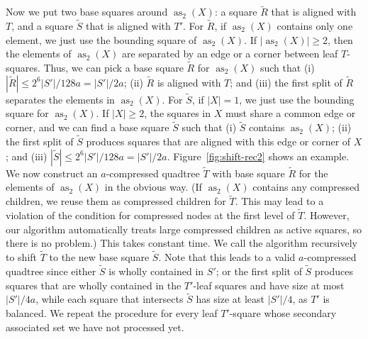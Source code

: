 \documentclass[11pt]{paper}
\DeclareMathOperator {\as}{as}
\begin{document}
      Now we put two base squares around $\as_2(X)$: a square $\widetilde{R}$
      that is aligned with $T$, and a square $\widetilde{S}$ that is 
      aligned with $T'$. For $\widetilde{R}$, if $\as_2(X)$ contains 
      only one element, we just use the bounding square of $\as_2(X)$.
      If $|\as_2(X)| \geq 2$, then the elements
      of $\as_2(X)$ are separated by an edge or a corner between 
      leaf $T$-squares. Thus,
      we can pick a base square $\widetilde{R}$ for $\as_2(X)$ such that 
      (i) $|\widetilde{R}| \leq 2^6|S'|/128a = |S'|/2a$; (ii) $\widetilde{R}$ is 
      aligned with $T$; and (iii) the first split of $\widetilde{R}$ 
      separates the elements in $\as_2(X)$.
      For $\widetilde{S}$, if $|X| =1$, we just use the bounding square for
      $\as_2(X)$. If $|X| \geq 2$, the squares in $X$ must share a common
      edge or corner, and we can find a base square $\widetilde{S}$ such that
      (i) $\widetilde{S}$ contains $\as_2(X)$; (ii) the first split of 
      $\widetilde{S}$ produces squares that are aligned with this edge or 
      corner of $X$; and (iii) $|\widetilde{S}| \leq 2^6|S'|/128a = |S'|/2a$.
      Figure~\ref {fig:shift-rec2} shows an example.
      We now construct an $a$-compressed quadtree $\widetilde{T}$
      with base square $\widetilde{R}$ for the elements of $\as_2(X)$
      in the obvious way. (If $\as_2(X)$ contains any compressed children, 
      we reuse them as compressed children for $\widetilde{T}$. This may 
      lead to a violation of the condition for compressed nodes at the 
      first level of $\widetilde{T}$. However, our algorithm automatically 
      treats large compressed children as active squares, so there is no 
      problem.) This takes constant time.  We call the algorithm recursively 
      to shift $\widetilde{T}$ to the new base
      square $\widetilde{S}$. Note that this leads to a valid $a$-compressed
      quadtree since either $\widetilde{S}$ is wholly contained in $S'$;
      or the first split of $\widetilde{S}$ produces squares that are wholly
      contained in the $T'$-leaf squares and have size at most $|S'|/4a$,
      while each square that intersects $\widetilde{S}$ has size at least
      $|S'|/4$, as $T'$ is  balanced. We repeat the procedure 
      for every leaf $T'$-square whose secondary associated set we 
      have not processed yet.
      
\end{document}
